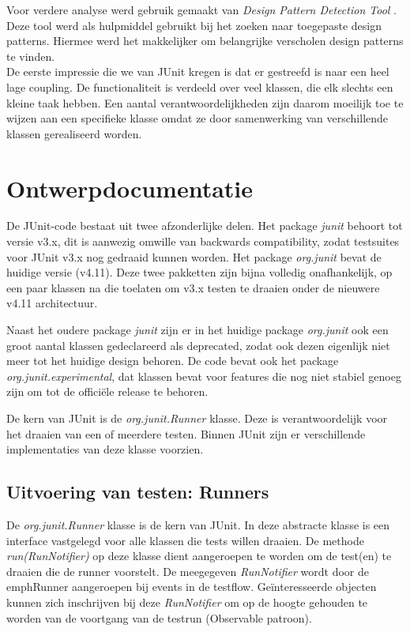 \documentclass[i1]{oss}
\begin{document}
Voor verdere analyse werd gebruik gemaakt van \emph{Design Pattern Detection Tool} \cite{Design Pattern Detection Tool}. Deze tool werd als hulpmiddel gebruikt bij het zoeken naar toegepaste design patterns. Hiermee werd het makkelijker om belangrijke verscholen design patterns te vinden.\\

De eerste impressie die we van JUnit kregen is dat er gestreefd is naar een heel lage coupling. De functionaliteit is verdeeld over veel klassen, die elk slechts een kleine taak hebben. Een aantal verantwoordelijkheden zijn daarom moeilijk toe te wijzen aan een specifieke klasse omdat ze door samenwerking van verschillende klassen gerealiseerd worden.\\

\section{Ontwerpdocumentatie}

De JUnit-code bestaat uit twee afzonderlijke delen. Het package \emph{junit} behoort tot versie v3.x, dit is aanwezig omwille van backwards compatibility, zodat testsuites voor JUnit v3.x nog gedraaid kunnen worden. Het package \emph{org.junit} bevat de huidige versie (v4.11). Deze twee pakketten zijn bijna volledig onafhankelijk, op een paar klassen na die toelaten om v3.x testen te draaien onder de nieuwere v4.11 architectuur.

Naast het oudere package \emph{junit} zijn er in het huidige package \emph{org.junit} ook een groot aantal klassen gedeclareerd als deprecated, zodat ook dezen eigenlijk niet meer tot het huidige design behoren. De code bevat ook het package \emph{org.junit.experimental}, dat klassen bevat voor features die nog niet stabiel genoeg zijn om tot de offici\"ele release te behoren.

De kern van JUnit is de \emph{org.junit.Runner} klasse. Deze is verantwoordelijk voor het draaien van een of meerdere testen. Binnen JUnit zijn er verschillende implementaties van deze klasse voorzien. 

\subsection{Uitvoering van testen: Runners}

De \emph{org.junit.Runner} klasse is de kern van JUnit. In deze abstracte klasse is een interface vastgelegd voor alle klassen die tests willen draaien. De methode \emph{run(RunNotifier)} op deze klasse dient aangeroepen te worden om de test(en) te draaien die de runner voorstelt. De meegegeven \emph{RunNotifier} wordt door de emph{Runner} aangeroepen bij events in de testflow. Ge\"interesseerde objecten kunnen zich inschrijven bij deze \emph{RunNotifier} om op de hoogte gehouden te worden van de voortgang van de testrun (Observable patroon).
\end{document}
